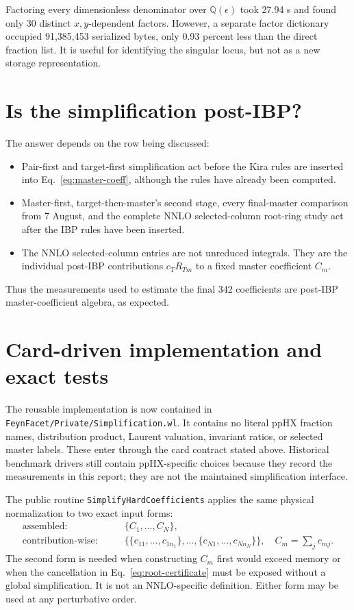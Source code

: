 \documentclass[11pt]{article}
\newcommand{\code}[1]{\texttt{#1}}
\newcommand{\eps}{\epsilon}
\begin{document}
Factoring every dimensionless denominator over $\mathbb Q(\eps)$ took 27.94 s
and found only 30 distinct $x,y$-dependent factors.  However, a separate
factor dictionary occupied 91,385,453 serialized bytes, only 0.93 percent less
than the direct fraction list.  It is useful for identifying the singular
locus, but not as a new storage representation.

\section{Is the simplification post-IBP?}

The answer depends on the row being discussed:
\begin{itemize}
  \item Pair-first and target-first simplification act before the Kira rules
  are inserted into Eq.~\eqref{eq:master-coeff}, although the rules have
  already been computed.
  \item Master-first, target-then-master's second stage, every final-master
  comparison from 7 August, and the complete NNLO selected-column root-ring
  study act after the IBP rules have been inserted.
  \item The NNLO selected-column entries are not unreduced integrals.  They are
  the individual post-IBP contributions $c_T R_{Tm}$ to a fixed master
  coefficient $C_m$.
\end{itemize}
Thus the measurements used to estimate the final 342 coefficients are
post-IBP master-coefficient algebra, as expected.

\section{Card-driven implementation and exact tests}

The reusable implementation is now contained in
\code{FeynFacet/Private/Simplification.wl}.  It contains no literal ppHX
fraction names, distribution product, Laurent valuation, invariant ratios, or
selected master labels.  These enter through the card contract stated above.
Historical benchmark drivers still contain ppHX-specific choices because they
record the measurements in this report; they are not the maintained
simplification interface.

The public routine \code{SimplifyHardCoefficients} applies the same physical
normalization to two exact input forms:
\begin{align}
  \text{assembled:}&\qquad \{C_1,\ldots,C_N\},\nonumber\\
  \text{contribution-wise:}&\qquad
  \bigl\{\{c_{11},\ldots,c_{1n_1}\},\ldots,
  \{c_{N1},\ldots,c_{Nn_N}\}\bigr\},
  \quad C_m=\sum_j c_{mj}.
  \label{eq:two-input-forms}
\end{align}
The second form is needed when constructing $C_m$ first would exceed memory or
when the cancellation in Eq.~\eqref{eq:root-certificate} must be exposed
without a global simplification.  It is not an NNLO-specific definition.
Either form may be used at any perturbative order.
\end{document}

